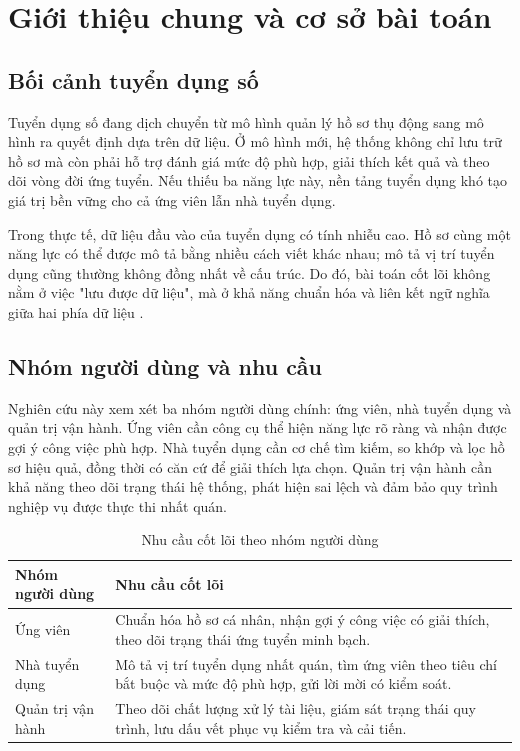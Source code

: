 \chapter{Giới thiệu chung và cơ sở bài toán}

\section{Bối cảnh tuyển dụng số}

Tuyển dụng số đang dịch chuyển từ mô hình quản lý hồ sơ thụ động sang mô hình ra quyết định dựa trên dữ liệu. Ở mô hình mới, hệ thống không chỉ lưu trữ hồ sơ mà còn phải hỗ trợ đánh giá mức độ phù hợp, giải thích kết quả và theo dõi vòng đời ứng tuyển. Nếu thiếu ba năng lực này, nền tảng tuyển dụng khó tạo giá trị bền vững cho cả ứng viên lẫn nhà tuyển dụng.

Trong thực tế, dữ liệu đầu vào của tuyển dụng có tính nhiễu cao. Hồ sơ cùng một năng lực có thể được mô tả bằng nhiều cách viết khác nhau; mô tả vị trí tuyển dụng cũng thường không đồng nhất về cấu trúc. Do đó, bài toán cốt lõi không nằm ở việc "lưu được dữ liệu", mà ở khả năng chuẩn hóa và liên kết ngữ nghĩa giữa hai phía dữ liệu \cite{requirements}.

\section{Nhóm người dùng và nhu cầu}

Nghiên cứu này xem xét ba nhóm người dùng chính: ứng viên, nhà tuyển dụng và quản trị vận hành. Ứng viên cần công cụ thể hiện năng lực rõ ràng và nhận được gợi ý công việc phù hợp. Nhà tuyển dụng cần cơ chế tìm kiếm, so khớp và lọc hồ sơ hiệu quả, đồng thời có căn cứ để giải thích lựa chọn. Quản trị vận hành cần khả năng theo dõi trạng thái hệ thống, phát hiện sai lệch và đảm bảo quy trình nghiệp vụ được thực thi nhất quán.

\begin{table}[H]
\caption{Nhu cầu cốt lõi theo nhóm người dùng}
\centering
\begin{tabularx}{\textwidth}{p{}X}
\toprule
\textbf{Nhóm người dùng} & \textbf{Nhu cầu cốt lõi}\\
\midrule
Ứng viên & Chuẩn hóa hồ sơ cá nhân, nhận gợi ý công việc có giải thích, theo dõi trạng thái ứng tuyển minh bạch.\\
Nhà tuyển dụng & Mô tả vị trí tuyển dụng nhất quán, tìm ứng viên theo tiêu chí bắt buộc và mức độ phù hợp, gửi lời mời có kiểm soát.\\
Quản trị vận hành & Theo dõi chất lượng xử lý tài liệu, giám sát trạng thái quy trình, lưu dấu vết phục vụ kiểm tra và cải tiến.\\
\bottomrule
\end{tabularx}
\end{table}

